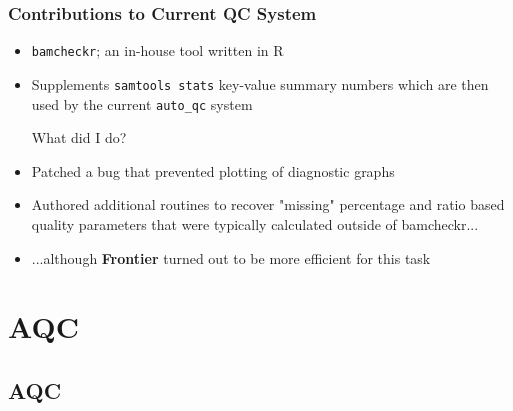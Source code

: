 \documentclass{beamer}
\begin{document}
\begin{frame}[t]
\frametitle{Contributions to Current QC System}
    \begin{itemize}
        \item \texttt{bamcheckr}; an in-house tool written in R
        \item Supplements \texttt{samtools stats} key-value summary numbers which 
            are then used by the current \texttt{auto\_qc} system

        \vskip 0.5cm

        \begin{beamerboxesrounded}[shadow=true]{}
            \begin{center}
                What did I do?
            \end{center}
        \end{beamerboxesrounded}
        \item Patched a bug that prevented plotting of diagnostic graphs
        \item Authored additional routines to recover "missing" percentage and ratio
            based quality parameters that were typically calculated outside of bamcheckr...
        \item ...although \textbf{Frontier} turned out to be more efficient for this task
    \end{itemize}
\end{frame}

\section{AQC}
\subsection{AQC}
\end{document}
